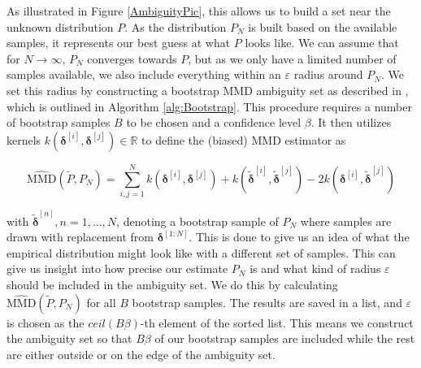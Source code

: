 As illustrated in Figure \ref{AmbiguityPic}, this allows us to build a set near the unknown distribution $P$. As the distribution $P_N$ is built based on the available samples, it represents our best guess at what $P$ looks like. We can assume that for $N \to \infty$, $P_N$ converges towards $P$, but as we only have a limited number of samples available, we also include everything within an $\varepsilon$ radius around $P_N$. We set this radius by constructing a bootstrap MMD ambiguity set as described in \cite{Yassine_22}, which is outlined in Algorithm \ref{alg:Bootstrap}. This procedure requires a number of bootstrap samples $B$ to be chosen and a confidence level $\beta$. It then utilizes kernels $k(\boldsymbol{\delta}^{[i]}, \boldsymbol{\delta}^{[j]}) \in \mathbb{R}$ to define the (biased) MMD estimator as 

\begin{equation} \label{ambiguity set approx}
\widehat{\text{MMD}} (\tilde{P}, P_N) = \sum_{i,j = 1}^N k(\boldsymbol{\delta}^{[i]}, \boldsymbol{\delta}^{[j]}) + k(\tilde{\boldsymbol{\delta}}^{[i]}, \tilde{\boldsymbol{\delta}}^{[j]}) - 2 k(\boldsymbol{\delta}^{[i]}, \tilde{\boldsymbol{\delta}}^{[j]})
\end{equation}

with $\tilde{\boldsymbol{\delta}}^{[n]}, n = 1,...,N$, denoting a bootstrap sample of $P_N$ where samples are drawn with replacement from $\boldsymbol{\delta}^{[1:N]}$. This is done to give us an idea of what the empirical distribution might look like with a different set of samples. This can give us insight into how precise our estimate $P_N$ is and what kind of radius $\varepsilon$ should be included in the ambiguity set. We do this by calculating $\widehat{\text{MMD}} (\tilde{P}, P_N)$ for all $B$ bootstrap samples. The results are saved in a list, and $\varepsilon$ is chosen as the $\textit{ceil}(B \beta)$-th element of the sorted list. This means we construct the ambiguity set so that $B \beta$ of our bootstrap samples are included while the rest are either outside or on the edge of the ambiguity set.


